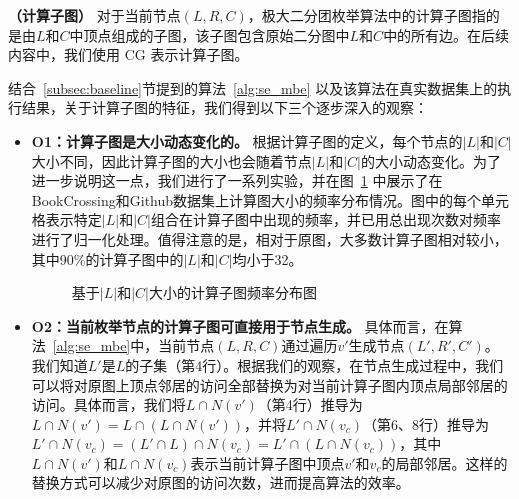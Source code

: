 \begin{definition}

	\textbf{（计算子图）} 对于当前节点$(L,R,C)$，极大二分团枚举算法中的计算子图指的是由$L$和$C$中顶点组成的子图，该子图包含原始二分图中$L$和$C$中的所有边。在后续内容中，我们使用 CG 表示计算子图。

\end{definition}

结合~\ref{subsec:baseline}节提到的算法~\ref{alg:se_mbe} 以及该算法在真实数据集上的执行结果，关于计算子图的特征，我们得到以下三个逐步深入的观察：


\begin{itemize}
\item \textbf{O1：计算子图是大小动态变化的。} 根据计算子图的定义，每个节点的$|L|$和$|C|$大小不同，因此计算子图的大小也会随着节点$|L|$和$|C|$的大小动态变化。为了进一步说明这一点，我们进行了一系列实验，并在图~\ref{fig:distribution} 中展示了在BookCrossing和Github数据集上计算图大小的频率分布情况。图中的每个单元格表示特定$|L|$和$|C|$组合在计算子图中出现的频率，并已用总出现次数对频率进行了归一化处理。值得注意的是，相对于原图，大多数计算子图相对较小，其中90\%的计算子图中的$|L|$和$|C|$均小于32。


\begin{figure} [H] 
	\centering

	\caption{基于$|L|$和$|C|$大小的计算子图频率分布图}
	\label{fig:distribution}

\end{figure}



\item \textbf{O2：当前枚举节点的计算子图可直接用于节点生成。} 具体而言，在算法~\ref{alg:se_mbe}中，当前节点$(L, R, C)$通过遍历$v'$生成节点$(L', R', C')$。我们知道$L'$是$L$的子集（第4行）。根据我们的观察，在节点生成过程中，我们可以将对原图上顶点邻居的访问全部替换为对当前计算子图内顶点局部邻居的访问。具体而言，我们将$L \cap N(v')$（第4行）推导为$L \cap N(v') = L \cap (L \cap N(v'))$，并将$L' \cap N(v_c)$（第6、8行）推导为$L' \cap N(v_c) = (L' \cap L) \cap N(v_c) = L' \cap (L \cap N(v_c))$，其中$L \cap N(v')$和$L \cap N(v_c)$表示当前计算子图中顶点$v'$和$v_c$的局部邻居。这样的替换方式可以减少对原图的访问次数，进而提高算法的效率。


\end{itemize}
